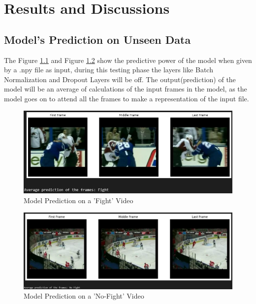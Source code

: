 \chapter{Results and Discussions}
\setcounter{equation}{0}


\section{Model's Prediction on Unseen Data}

\noindent The Figure \ref{fig:FightPred} and Figure \ref{fig:noFightPred} show the predictive power of the model when given by a .npy file as input, during this testing phase the layers like Batch Normalization and Dropout Layers will be off. The output(prediction) of the model will be an average of calculations of the input frames in the model, as the model goes on to attend all the frames to make a representation of the input file. 

\begin{figure}[htbp]
    \centering
    \includegraphics[width=1\textwidth]{Images/single_video_fight_pred.png}
    \caption{Model Prediction on a 'Fight' Video}
    \label{fig:FightPred}
\end{figure}

\begin{figure}[htbp]
    \centering
    \includegraphics[width=1\textwidth]{Images/single_video_no_fight_pred.png}
    \caption{Model Prediction on a 'No-Fight' Video}
    \label{fig:noFightPred}
\end{figure}


